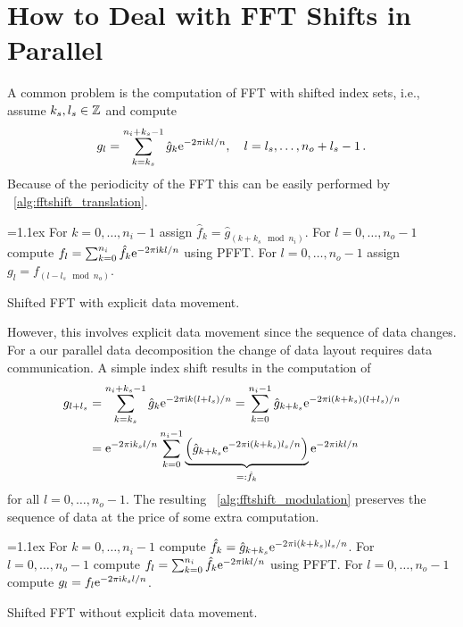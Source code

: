 \section{How to Deal with FFT Shifts in Parallel}
A common problem is the computation of FFT with shifted index sets, i.e., assume $k_s,l_s\in\mathbb{Z}$ and compute
\begin{equation*}
  g_l = \sum_{k=k_s}^{n_i+k_s-1} \hat g_k \mathrm{e}^{-2\pi{\ensuremath{\text{\scriptsize{i}}}} kl/n},
  \quad l=l_s,\hdots,n_o+l_s-1\,.
\end{equation*}
Because of the periodicity of the FFT this can be easily performed by \algname~\ref{alg:fftshift_translation}.
\begin{algorithm}\label{alg:fftshift_translation}
  \begin{algorithmic}[1]
    \itemsep=1.1ex
    \State For $k=0,\hdots,n_i-1$ assign $\hat f_k = \hat g_{(k+k_s\mod n_i)}$.
    \State For $l=0,\hdots,n_o-1$ compute $f_l = \sum_{k=0}^{n_i} \hat f_k \mathrm{e}^{-2\pi{\ensuremath{\text{\scriptsize{i}}}} kl/n}$ using PFFT.
    \State For $l=0,\hdots,n_o-1$ assign $g_l = f_{(l-l_s\mod n_o)}$.
  \end{algorithmic}
  \caption{Shifted FFT with explicit data movement.}
\end{algorithm}
However, this involves explicit data movement since the sequence of data changes.
For a our parallel data decomposition the change of data layout requires data communication.
A simple index shift results in the computation of
\begin{align*}
  g_{l+l_s}
  &=
    \sum_{k=k_s}^{n_i+k_s-1} \hat g_k \mathrm{e}^{-2\pi{\ensuremath{\text{\scriptsize{i}}}} k(l+l_s)/n}
    =
    \sum_{k=0}^{n_i-1} \hat g_{k+k_s} \mathrm{e}^{-2\pi{\ensuremath{\text{\scriptsize{i}}}} (k+k_s)(l+l_s)/n} \\
  &=
    \mathrm{e}^{-2\pi{\ensuremath{\text{\scriptsize{i}}}} k_sl/n} \sum_{k=0}^{n_i-1} \underbrace{\left(\hat g_{k+k_s}\mathrm{e}^{-2\pi{\ensuremath{\text{\scriptsize{i}}}} (k+k_s)l_s/n}\right)}_{=: \hat f_k} \mathrm{e}^{-2\pi{\ensuremath{\text{\scriptsize{i}}}} kl/n}
\end{align*}
for all $l=0,\hdots,n_o-1$. The resulting \algname~\ref{alg:fftshift_modulation} preserves the sequence of
data at the price of some extra computation.
\begin{algorithm}\label{alg:fftshift_modulation}
  \begin{algorithmic}[1]
    \itemsep=1.1ex
    \State For $k=0,\hdots,n_i-1$ compute $\hat f_k = \hat g_{k+k_s} \mathrm{e}^{-2\pi{\ensuremath{\text{\scriptsize{i}}}} (k+k_s)l_s/n}$.
    \State For $l=0,\hdots,n_o-1$ compute $f_l = \sum_{k=0}^{n_i} \hat f_k \mathrm{e}^{-2\pi{\ensuremath{\text{\scriptsize{i}}}} kl/n}$ using PFFT.
    \State For $l=0,\hdots,n_o-1$ compute $g_l = f_l \mathrm{e}^{-2\pi{\ensuremath{\text{\scriptsize{i}}}} k_sl/n}$.
  \end{algorithmic}
  \caption{Shifted FFT without explicit data movement.}
\end{algorithm}

